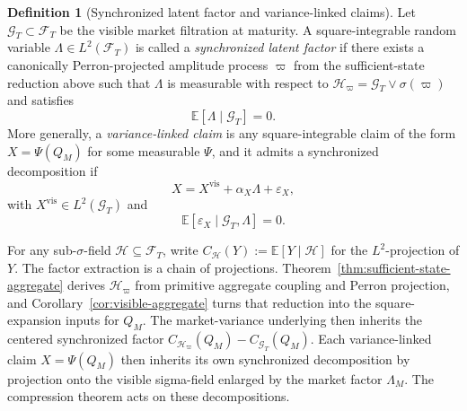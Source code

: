 \documentclass[11pt,a4paper]{amsart}
\theoremstyle{plain}
\theoremstyle{definition}
\newtheorem{definition}[theorem]{Definition}
\theoremstyle{remark}
\newcommand{\EE}{\mathbb{E}}
\newcommand{\cH}{\mathcal{H}}
\newcommand{\cF}{\mathcal{F}}
\newcommand{\cG}{\mathcal{G}}
\begin{document}
\begin{definition}[Synchronized latent factor and variance-linked claims]
Let \(\cG_T\subset\cF_T\) be the visible market filtration at maturity.  A square-integrable random
variable \(\Lambda\in L^2(\cF_T)\) is called a \emph{synchronized latent factor} if there exists a
canonically Perron-projected amplitude process \(\varpi\) from the sufficient-state reduction above
such that \(\Lambda\) is measurable with respect to \(\cH_\varpi=\cG_T\vee \sigma(\varpi)\) and satisfies
\[
        \EE[\Lambda\mid \cG_T]=0.
\]
More generally, a \emph{variance-linked claim} is any square-integrable claim of the form
\(X=\Psi(Q_M)\) for some measurable \(\Psi\), and it admits a synchronized decomposition if
\[
        X=X^{\mathrm{vis}}+\alpha_X\Lambda+\varepsilon_X,
\]
with \(X^{\mathrm{vis}}\in L^2(\cG_T)\) and
\[
        \EE[\varepsilon_X\mid \cG_T,\Lambda]=0.
\]
\end{definition}

\noindent
For any sub-\(\sigma\)-field \(\cH\subseteq\cF_T\), write
\(C_{\cH}(Y):=\EE[Y\mid\cH]\) for the \(L^2\)-projection of \(Y\).  The factor extraction is a chain
of projections.  Theorem~\ref{thm:sufficient-state-aggregate} derives \(\cH_\varpi\) from primitive
aggregate coupling and Perron projection, and Corollary~\ref{cor:visible-aggregate} turns that
reduction into the square-expansion inputs for \(Q_M\).  The market-variance underlying then
inherits the centered synchronized factor
\(
        C_{\cH_\varpi}(Q_M)-C_{\cG_T}(Q_M)
\).
Each variance-linked claim \(X=\Psi(Q_M)\) then inherits its own synchronized decomposition by
projection onto the visible sigma-field enlarged by the market factor \(\Lambda_M\).  The
compression theorem acts on these decompositions.
\end{document}
